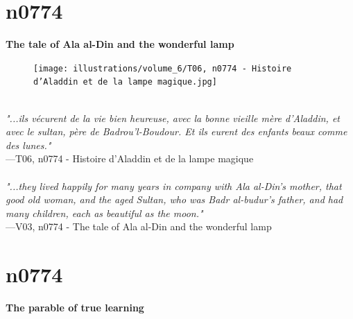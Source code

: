 \documentclass[../Carre_nights.tex]{subfiles}
\begin{document}
\newpage

\section{n0774}
\textbf{\Large{The tale of Ala al-Din and the wonderful lamp}} \\

\begin{figure}[ht]
\centering
\texttt{[image: illustrations/volume\_6/T06, n0774 - Histoire d’Aladdin et de la lampe magique.jpg]}
\end{figure}

\textit{\\
"...ils vécurent de la vie bien heureuse, avec la bonne vieille mère d’Aladdin, et avec le sultan, père de Badrou’l-Boudour. Et ils eurent des enfants beaux comme des lunes."} \\
—T06, n0774 - Histoire d’Aladdin et de la lampe magique \\~\\
\textit{"...they lived happily for many years in company with Ala al-Din's mother, that good old woman, and the aged Sultan, who was Badr al-budur's father, and had many children, each as beautiful as the moon."} \\
—V03, n0774 - The tale of Ala al-Din and the wonderful lamp

\newpage

\section{n0774}
\textbf{\Large{The parable of true learning}} \\
\end{document}

